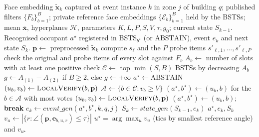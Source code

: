 \documentclass[pdflatex,sn-mathphys-num]{sn-jnl}%
\theoremstyle{thmstyleone}%
\theoremstyle{thmstyletwo}%
\theoremstyle{thmstylethree}%
\begin{document}
\begin{algorithm}[!t]
\footnotesize
\caption{Adaptive candidate routing, event generation and state generation}
\label{alg:adaptive-routing}
\begin{algorithmic}[1]
\Require Face embedding $\tilde{\mathbf{x}}_k$ captured at event instance $k$ in zone $j$ of building $q$;
\Statex published filters $\{F_b\}_{b=1}^{B}$; private reference face embeddings $\{\mathcal{E}_b\}_{b=1}^{B}$ held by the BSTSs;
\Statex mean $\bar{\mathbf{x}}$, hyperplanes $\mathcal{H}$, parameters $K,L,P,S,V,\tau,g_0$;
\Statex current state $S_{k-1}$.
\Ensure Recognised occupant $a^\star$ registered in BSTS$_{b^\star}$ (or $\mathrm{ABSTAIN}$), event $e_k$ and next state $S_k$.
\State $\mathbf{p}\gets$ preprocessed $\tilde{\mathbf{x}}_k$ 
  \State compute $s_\ell$ and the $P$ probe items $s'_{\ell,1},\dots,s'_{\ell,P}$ 
\EndFor
{}
  \State check the original and probe items of every slot against $F_b$
  \State $A_b\gets$ number of slots with at least one positive check 
\EndFor
\State $\mathcal{C}\gets$ top $\min(S,B)$ BSTSs by decreasing $A_b$ 
\State $g\gets A_{(1)}-A_{(2)}$ if $B\geq2$, else $g\gets+\infty$
\State $a^\star\gets\mathrm{ABSTAIN}$
 
    \State $(u_b,v_b)\gets\textsc{LocalVerify}(b,\mathbf{p})$
  \EndFor
  \State $\mathcal{A}\gets\{b\in\mathcal{C}:v_b\geq V\}$
   \State $(a^\star,b^\star)\gets(u_b,b)$ for the $b\in\mathcal{A}$ with most votes  \EndIf
\Else {}
    \State $(u_b,v_b)\gets\textsc{LocalVerify}(b,\mathbf{p})$
     \State $(a^\star,b^\star)\gets(u_b,b)$; \textbf{break} \EndIf
  \EndFor
\EndIf
\State $e_k\gets\textit{event\_gen}(a^\star,b^\star,k,q,j)$ 
\State $S_k\gets\textit{state\_gen}(S_{k-1},e_k)$ 
\State \Return $a^\star,e_k,S_k$
 
    \State $v_u\gets|\{r:\angle(\mathbf{p},\mathbf{e}_{b,u,r})\leq\tau\}|$
  \EndFor
  \State \Return $u^\star=\arg\max_u v_u$ (ties by smallest reference angle) and $v_{u^\star}$
\EndFunction
\end{algorithmic}
\end{algorithm}
\end{document}
